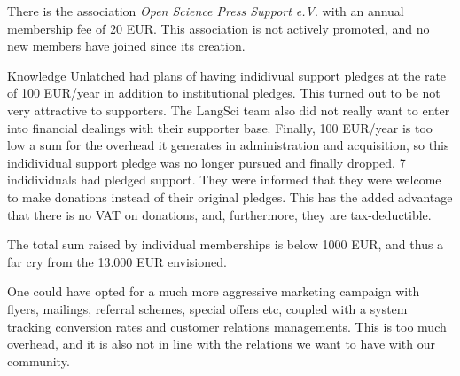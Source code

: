 \documentclass[output=guidelines,nonflat,smallfont,
draftmode
]{langsci/langscibook}
\newcommand{\evaluation}[1]{
  \renewcommand{\tblslinecolour}{lsLightOrange}
  \tblssy{receipt}{Evaluation}{\vspace*{-5mm}#1}
}
\newcommand{\othersolutions}[1]{
  \renewcommand{\tblslinecolour}{lsDarkGreenOne}
  \tblssy{more}{Other solutions}{\vspace*{-5mm}#1}
}
\renewcommand{\tblssy}[4][black!12]{%
  \renewcommand{\langscisymbol}{#2}\renewcommand{\tblsboxcolor}{#1}
  \begin{mdframed}[style=yellowexercise,frametitle={#3}]
    #4
  \end{mdframed}
}
\begin{document}
\evaluation{
There is the association \textit{Open Science Press Support e.V}. with an annual membership fee of 20 EUR. This association is not actively promoted, and no new members have joined since its creation. 

Knowledge Unlatched had plans of having indidivual support pledges at the rate of 100 EUR/year in addition to institutional pledges. This turned out to be not very attractive to supporters. The LangSci team also did not really want to enter into financial dealings with their supporter base. Finally, 100 EUR/year is too low a sum for the overhead it generates in administration and acquisition, so this indidividual support pledge was no longer pursued and finally dropped. 7 indidividuals had pledged support. They were informed that they were welcome to make donations instead of their original pledges. This has the added advantage that there is no VAT on donations, and, furthermore, they are tax-deductible. 

The total sum raised by individual memberships is below 1000 EUR, and thus a far cry from the 13.000 EUR envisioned. 

}
\othersolutions{
One could have opted for a much more aggressive marketing campaign with flyers, mailings, referral schemes, special offers etc, coupled with a system tracking conversion rates and customer relations managements. This is too much overhead, and it is also not in line with the relations we want to have with our community. 
}

\newpage 
\end{document}
